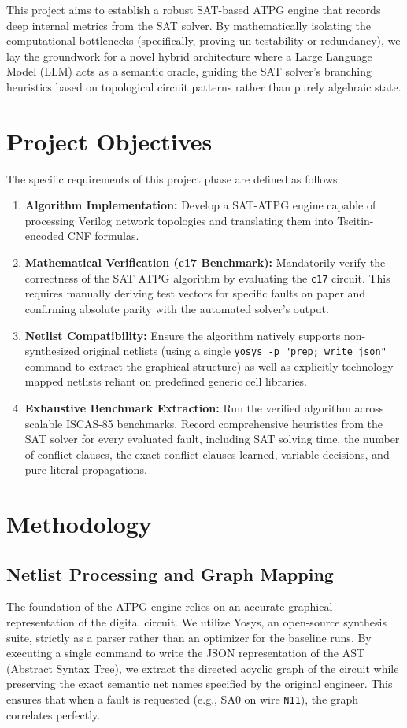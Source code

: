 \documentclass[11pt,a4paper]{article}
\begin{document}
This project aims to establish a robust SAT-based ATPG engine that records deep internal metrics from the SAT solver. By mathematically isolating the computational bottlenecks (specifically, proving un-testability or redundancy), we lay the groundwork for a novel hybrid architecture where a Large Language Model (LLM) acts as a semantic oracle, guiding the SAT solver's branching heuristics based on topological circuit patterns rather than purely algebraic state.

\section{Project Objectives}
The specific requirements of this project phase are defined as follows:
\begin{enumerate}
    \item \textbf{Algorithm Implementation:} Develop a SAT-ATPG engine capable of processing Verilog network topologies and translating them into Tseitin-encoded CNF formulas.
    \item \textbf{Mathematical Verification (c17 Benchmark):} Mandatorily verify the correctness of the SAT ATPG algorithm by evaluating the \texttt{c17} circuit. This requires manually deriving test vectors for specific faults on paper and confirming absolute parity with the automated solver's output.
    \item \textbf{Netlist Compatibility:} Ensure the algorithm natively supports non-synthesized original netlists (using a single \texttt{yosys -p "prep; write\_json"} command to extract the graphical structure) as well as explicitly technology-mapped netlists reliant on predefined generic cell libraries.
    \item \textbf{Exhaustive Benchmark Extraction:} Run the verified algorithm across scalable ISCAS-85 benchmarks. Record comprehensive heuristics from the SAT solver for every evaluated fault, including SAT solving time, the number of conflict clauses, the exact conflict clauses learned, variable decisions, and pure literal propagations.
\end{enumerate}

\section{Methodology}

\subsection{Netlist Processing and Graph Mapping}
The foundation of the ATPG engine relies on an accurate graphical representation of the digital circuit. We utilize Yosys, an open-source synthesis suite, strictly as a parser rather than an optimizer for the baseline runs. By executing a single command to write the JSON representation of the AST (Abstract Syntax Tree), we extract the directed acyclic graph of the circuit while preserving the exact semantic net names specified by the original engineer. This ensures that when a fault is requested (e.g., SA0 on wire \texttt{N11}), the graph correlates perfectly.
\end{document}
